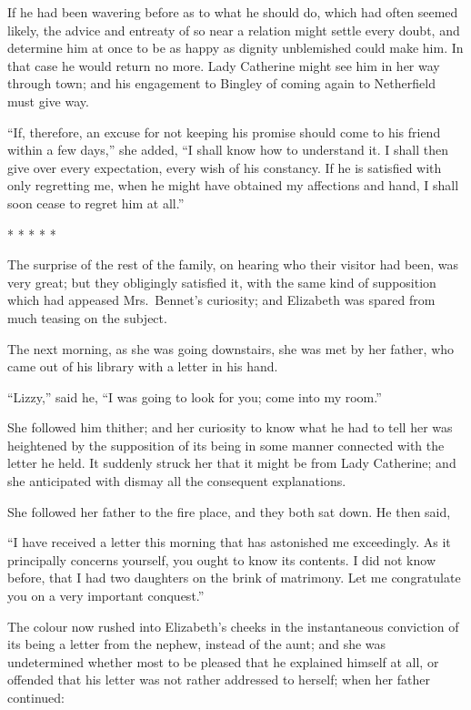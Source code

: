 If he had been wavering before as to what he should do, which
had often seemed likely, the advice and entreaty of so near a
relation might settle every doubt, and determine him at once to
be as happy as dignity unblemished could make him.  In that
case he would return no more.  Lady Catherine might see him in
her way through town; and his engagement to Bingley of coming
again to Netherfield must give way.

``If, therefore, an excuse for not keeping his promise should
come to his friend within a few days,'' she added, ``I shall
know how to understand it.  I shall then give over every
expectation, every wish of his constancy.  If he is satisfied
with only regretting me, when he might have obtained my
affections and hand, I shall soon cease to regret him at all.''

\begin{center}* * * * *\end{center}

The surprise of the rest of the family, on hearing who their
visitor had been, was very great; but they obligingly satisfied
it, with the same kind of supposition which had appeased
Mrs.\ Bennet's curiosity; and Elizabeth was spared from much
teasing on the subject.

The next morning, as she was going downstairs, she was met by
her father, who came out of his library with a letter in his
hand.

``Lizzy,'' said he, ``I was going to look for you; come into my
room.''

She followed him thither; and her curiosity to know what he
had to tell her was heightened by the supposition of its being
in some manner connected with the letter he held.  It suddenly
struck her that it might be from Lady Catherine; and she
anticipated with dismay all the consequent explanations.

She followed her father to the fire place, and they both sat
down.  He then said,

``I have received a letter this morning that has astonished me
exceedingly.  As it principally concerns yourself, you ought
to know its contents.  I did not know before, that I had two
daughters on the brink of matrimony.  Let me congratulate you
on a very important conquest.''

The colour now rushed into Elizabeth's cheeks in the instantaneous
conviction of its being a letter from the nephew, instead of the
aunt; and she was undetermined whether most to be pleased that
he explained himself at all, or offended that his letter was not
rather addressed to herself; when her father continued:

